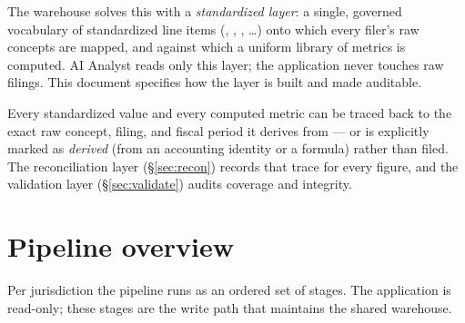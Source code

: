 \documentclass[11pt]{article}
\begin{document}
The  warehouse solves this with a \emph{standardized layer}: a
single, governed vocabulary of standardized line items (,
, , \dots) onto which every
filer's raw concepts are mapped, and against which a uniform library of metrics is
computed. AI Analyst reads only this layer; the application never touches raw
filings. This document specifies how the layer is built and made auditable.

\begin{keybox}
Every standardized value and every computed metric can be traced back to the exact
raw concept, filing, and fiscal period it derives from --- or is explicitly marked
as \emph{derived} (from an accounting identity or a formula) rather than filed. The
reconciliation layer (\S\ref{sec:recon}) records that trace for every figure, and
the validation layer (\S\ref{sec:validate}) audits coverage and integrity.
\end{keybox}

\section{Pipeline overview}
\label{sec:overview}

Per jurisdiction the pipeline runs as an ordered set of stages. The application is
read-only; these stages are the write path that maintains the shared warehouse.
\end{document}
